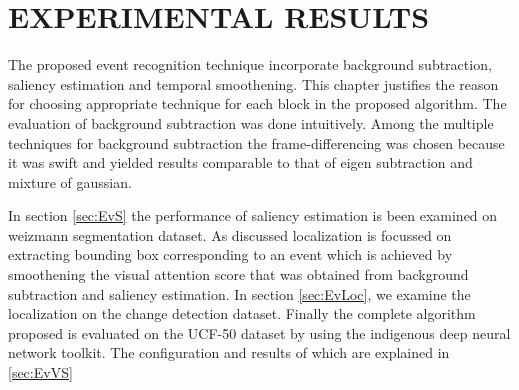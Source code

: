 \chapter{EXPERIMENTAL RESULTS}
\label{chap:exp}
The proposed event recognition technique incorporate background subtraction, saliency estimation and temporal smoothening.  This chapter justifies the reason for choosing appropriate technique for each block in the proposed algorithm.  The evaluation of background subtraction was done intuitively.  Among the multiple techniques for background subtraction the frame-differencing was chosen because it was swift and yielded results comparable to that of eigen subtraction and mixture of gaussian.
\par In section \ref{sec:EvS} the performance of saliency estimation is been examined on  weizmann segmentation dataset.  As discussed localization is focussed on extracting bounding box corresponding to an event which is achieved by smoothening the  visual attention score that was obtained from background subtraction and saliency estimation.  In section \ref{sec:EvLoc}, we examine the localization on the change detection dataset.  
Finally the complete algorithm proposed is evaluated on the UCF-50 dataset by using the indigenous deep neural network toolkit.  The configuration and results of which are explained in \ref{sec:EvVS}

